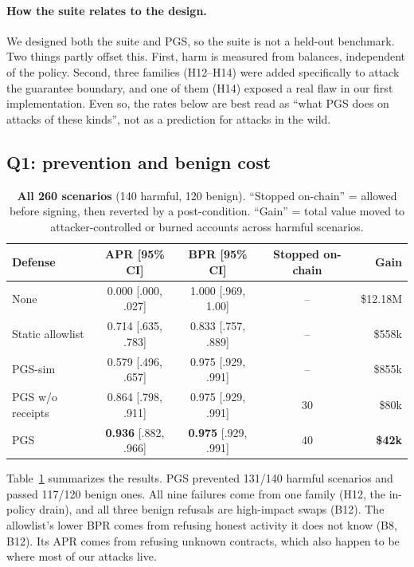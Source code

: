 \documentclass[11pt]{article}
\newcommand{\pgs}{\textsc{PGS}}
\begin{document}
\paragraph{How the suite relates to the design.} We designed both the suite and \pgs{}, so the suite is not a held-out benchmark. Two things partly offset this. First, harm is measured from balances, independent of the policy. Second, three families (H12--H14) were added specifically to attack the guarantee boundary, and one of them (H14) exposed a real flaw in our first implementation. Even so, the rates below are best read as ``what \pgs{} does on attacks of these kinds'', not as a prediction for attacks in the wild.

\subsection{Q1: prevention and benign cost}

\begin{table}[t]
\centering\small
\caption{\textbf{All 260 scenarios} (140 harmful, 120 benign). ``Stopped on-chain'' = allowed before signing, then reverted by a post-condition. ``Gain'' = total value moved to attacker-controlled or burned accounts across harmful scenarios.}
\label{tab:main}
\begin{tabular}{lcccr}
\toprule
Defense & APR [95\% CI] & BPR [95\% CI] & Stopped on-chain & Gain \\
\midrule
None & 0.000 [.000, .027] & 1.000 [.969, 1.00] & -- & \$12.18M \\
Static allowlist & 0.714 [.635, .783] & 0.833 [.757, .889] & -- & \$558k \\
\pgs{}-sim & 0.579 [.496, .657] & 0.975 [.929, .991] & -- & \$855k \\
\pgs{} w/o receipts & 0.864 [.798, .911] & 0.975 [.929, .991] & 30 & \$80k \\
\pgs{} & \textbf{0.936} [.882, .966] & \textbf{0.975} [.929, .991] & 40 & \textbf{\$42k} \\
\bottomrule
\end{tabular}
\end{table}

Table~\ref{tab:main} summarizes the results. \pgs{} prevented 131/140 harmful scenarios and passed 117/120 benign ones. All nine failures come from one family (H12, the in-policy drain), and all three benign refusals are high-impact swaps (B12). The allowlist's lower BPR comes from refusing honest activity it does not know (B8, B12). Its APR comes from refusing unknown contracts, which also happen to be where most of our attacks live.
\end{document}
